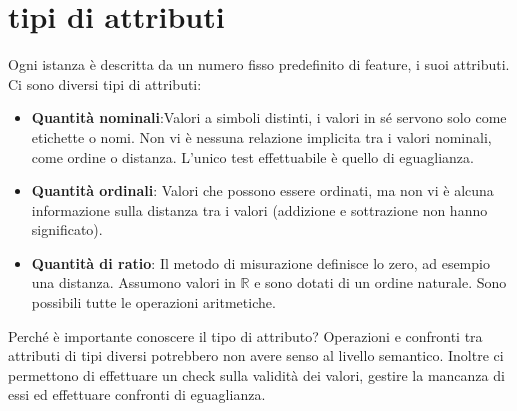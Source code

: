 \documentclass{../main.tex}[subfiles]
\begin{document}
\section{tipi di attributi}
Ogni istanza è descritta da un numero fisso predefinito di feature, i suoi attributi.
Ci sono diversi tipi di attributi:
\begin{itemize}
	\item \textbf{Quantità nominali}:Valori a simboli distinti, i valori in sé servono solo come etichette o nomi.
		Non vi è nessuna relazione implicita tra i valori nominali, come ordine o distanza. L'unico test effettuabile è quello di eguaglianza.
	\item \textbf{Quantità ordinali}: Valori che possono essere ordinati, ma non vi è alcuna informazione sulla distanza tra i valori (addizione e sottrazione non hanno significato).
	\item \textbf{Quantità di ratio}: Il metodo di misurazione definisce lo zero, ad esempio una distanza. Assumono valori in $\mathbb{R}$ e sono dotati di un ordine naturale. Sono possibili tutte le operazioni aritmetiche.
\end{itemize}
Perché è importante conoscere il tipo di attributo? Operazioni e confronti tra attributi di tipi diversi potrebbero non avere senso al livello semantico. Inoltre ci permettono di effettuare un check sulla validità dei valori, gestire la mancanza di essi ed effettuare confronti di eguaglianza.
\end{document}
